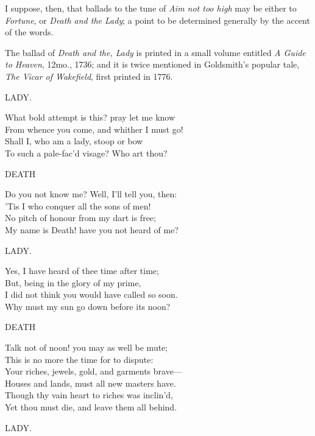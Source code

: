 I suppose, then, that ballads to the tune of \textit{Aim not too high} may be either
to \textit{Fortune}, or \textit{Death and the Lady}; a point to be determined generally by the
accent of the words.

The ballad of \textit{Death and the, Lady} is printed in a small volume entitled \textit{A Guide
to Heaven}, 12mo., 1736; and it is twice mentioned in Goldsmith’s popular tale,
\textit{The Vicar of Wakefield}, first printed in 1776.



\pagebreak

\begin{dcverse}\scriptsizerrr
\vin\vin\vin\vin\vin LADY.

What bold attempt is this? pray let me know\\
From whence you come, and whither I must go!\\
Shall I, who am a lady, stoop or bow\\
To such a pale-fac’d visage? Who art thou?

\vin\vin\vin\vin\vin DEATH

Do you not know me? Well, I’ll tell you, then:\\
’Tis I who conquer all the sons of men!\\
No pitch of honour from my dart is free;\\
My name is Death! have you not heard of me?

\vin\vin\vin\vin\vin LADY.

Yes, I have heard of thee time after time;\\
But, being in the glory of my prime,\\
I did not think you would have called so soon.\\
Why must my sun go down before its noon?

\vin\vin\vin\vin\vin DEATH

Talk not of noon! you may as well be mute;\\
This is no more the time for to dispute:\\
Your riches, jewels, gold, and garments brave—\\
Houses and lands, must all new masters have.\\
Though thy vain heart to riches was inclin’d,\\
Yet thou must die, and leave them all behind.

\vin\vin\vin\vin\vin LADY.


\end{dcverse}
